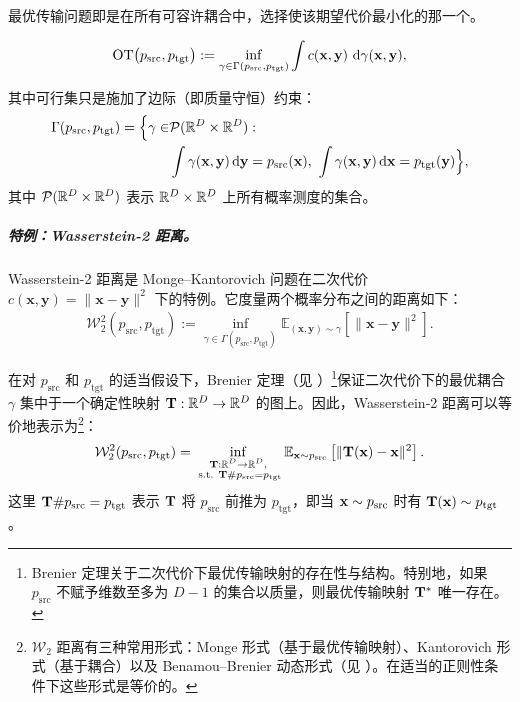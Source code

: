 最优传输问题即是在所有可容许耦合中，选择使该期望代价最小化的那一个。
\begin{mdframed}
\begin{equation}\label{eq:ot}
\mathrm{OT}\big(p_{\mathrm{src}},p_{\mathrm{tgt}}\big)
:= \inf_{\gamma\in\Gamma(p_{\mathrm{src}},p_{\mathrm{tgt}})}
\int c({\mathbf{x}},{\mathbf{y}})\,\mathop{}\!\mathrm{d}\gamma({\mathbf{x}},{\mathbf{y}}),
\end{equation}
\end{mdframed}
其中可行集只是施加了边际（即质量守恒）约束：
\begin{align*}
    \Gamma(p_{\mathrm{src}},p_{\mathrm{tgt}})
= \Big\{\gamma \in &\mathcal{P}(\mathbb{R}^D\times\mathbb{R}^D): \\
&\int \gamma({\mathbf{x}},{\mathbf{y}}) \mathop{}\!\mathrm{d} {\mathbf{y}} = p_{\mathrm{src}}({\mathbf{x}}),\,\,
\int \gamma({\mathbf{x}},{\mathbf{y}})\mathop{}\!\mathrm{d} {\mathbf{x}} = p_{\mathrm{tgt}}({\mathbf{y}})\Big\},
\end{align*}
其中 $\mathcal{P}(\mathbb{R}^D\times\mathbb{R}^D)$ 表示 $\mathbb{R}^D\times\mathbb{R}^D$ 上所有概率测度的集合。  


\subparagraph{特例：Wasserstein-2 距离。}

Wasserstein-2 距离是 Monge--Kantorovich 问题在二次代价 $c(\mathbf{x}, \mathbf{y}) = \|\mathbf{x} - \mathbf{y}\|^2$ 下的特例。它度量两个概率分布之间的距离如下：
\begin{align*}
 \mathcal{W}_2^2(p_{\mathrm{src}}, p_{\mathrm{tgt}}) := \inf_{\gamma \in \Gamma(p_{\mathrm{src}}, p_{\mathrm{tgt}})} \mathbb{E}_{(\mathbf{x}, \mathbf{y}) \sim \gamma} \left[ \|\mathbf{x} - \mathbf{y}\|^2 \right].
\end{align*}

在对 $p_{\mathrm{src}}$ 和 $p_{\mathrm{tgt}}$ 的适当假设下，Brenier 定理（见 ）\footnote{Brenier 定理关于二次代价下最优传输映射的存在性与结构。特别地，如果 $p_{\mathrm{src}}$ 不赋予维数至多为 $D-1$ 的集合以质量，则最优传输映射 ${\mathbf{T}}^*$ 唯一存在。}保证二次代价下的最优耦合 $\gamma$ 集中于一个确定性映射 ${\mathbf{T}}:\mathbb{R}^D \rightarrow \mathbb{R}^D$ 的图上。因此，Wasserstein-2 距离可以等价地表示为\footnote{$\mathcal{W}_2$ 距离有三种常用形式：Monge 形式（基于最优传输映射）、Kantorovich 形式（基于耦合）以及 Benamou--Brenier 动态形式（见 ）。在适当的正则性条件下这些形式是等价的。}：
\begin{equation}\label{eq: Monge's Formulation}    \mathcal{W}_2^2(p_{\mathrm{src}}, p_{\mathrm{tgt}}) = \inf_{\substack{{\mathbf{T}}:\mathbb{R}^D \rightarrow \mathbb{R}^D,\\ \text{ s.t. }{\mathbf{T}}\#p_{\mathrm{src}} = p_{\mathrm{tgt}}}} \mathbb{E}_{{\mathbf{x}} \sim p_{\mathrm{src}}} \left[ \| {\mathbf{T}}({\mathbf{x}}) - {\mathbf{x}} \|^2 \right].
\end{equation}
这里 ${\mathbf{T}}\#p_{\mathrm{src}} = p_{\mathrm{tgt}}$ 表示 $ {\mathbf{T}} $ 将 $ p_{\mathrm{src}} $ 前推为 $ p_{\mathrm{tgt}} $，即当 $ {\mathbf{x}} \sim p_{\mathrm{src}}$ 时有 $ {\mathbf{T}}({\mathbf{x}}) \sim p_{\mathrm{tgt}}$。 

